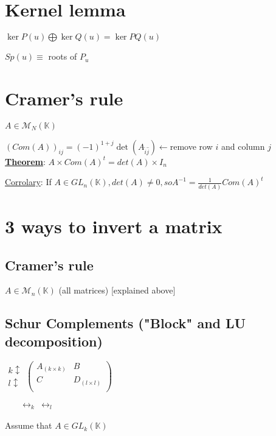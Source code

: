 \documentclass{article}
\begin{document}
\section{Kernel lemma}
$\ker P(u) \bigoplus \ker Q(u)= \ker PQ(u)$

\noindent$Sp(u) \equiv$ roots of $P_u$

\section{Cramer's rule}
$A\in \mathcal{M}_N(\mathbb{K})$

\noindent$(Com(A))_{ij}=(-1)^{1+j}\det(A_{\hat{i}\hat{j}})\longleftarrow$remove row $i$ and column $j$\\

\noindent\underline{\textbf{Theorem}}: $A\times Com(A)^t = det(A)\times I_n$

\noindent\underline{Corrolary}: If $A\in GL_n(\mathbb{K}), det(A)\neq 0, so A^{-1}=\frac{1}{det(A)}Com(A)^t$

\section{3 ways to invert a matrix}
    \subsection{Cramer's rule}
    $A\in \mathcal{M}_n(\mathbb{K})$ (all matrices)
    [explained above]

    \subsection{Schur Complements ("Block" and LU decomposition)}
    $\begin{array}{c}
         k\updownarrow \\
         l\updownarrow
    \end{array}\begin{pmatrix}
        A_{(k\times k)} & B \\
        C & D_{(l\times l)} \\
    \end{pmatrix}$

    $\hspace{20pt}\begin{array}{cc}
        \longleftrightarrow_k & \longleftrightarrow_l 
    \end{array}$

    Assume that $A\in GL_k(\mathbb{K})$\\
\end{document}
